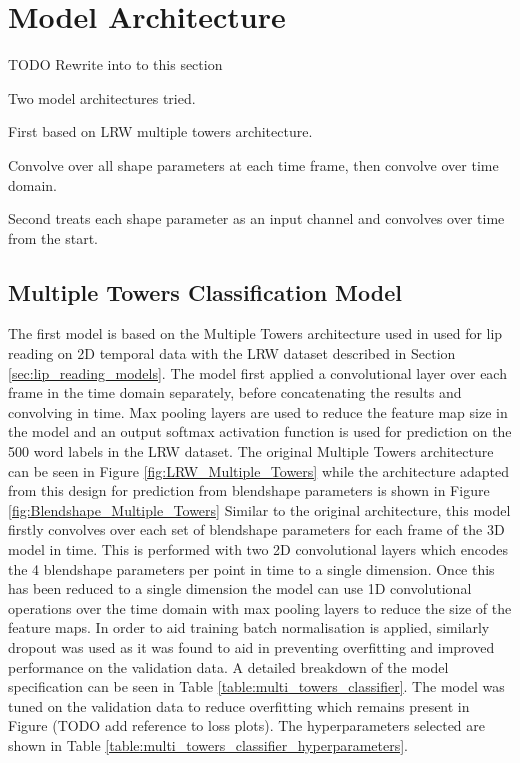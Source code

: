 \section{Model Architecture}

TODO Rewrite into to this section

Two model architectures tried.

First based on LRW multiple towers architecture.

Convolve over all shape parameters at each time frame, then convolve over time domain.

Second treats each shape parameter as an input channel and convolves over time from the start.

\subsection{Multiple Towers Classification Model}
The first model is based on the Multiple Towers architecture used in \cite{Cheng2016} used for lip reading on 2D temporal data with the LRW dataset described in Section \ref{sec:lip_reading_models}.
The model first applied a convolutional layer over each frame in the time domain separately, before concatenating the results and convolving in time.
Max pooling layers are used to reduce the feature map size in the model and an output softmax activation function is used for prediction on the 500 word labels in the LRW dataset.
The original Multiple Towers architecture can be seen in Figure \ref{fig:LRW_Multiple_Towers} while the architecture adapted from this design for prediction from blendshape parameters is shown in Figure \ref{fig:Blendshape_Multiple_Towers}
Similar to the original architecture, this model firstly convolves over each set of blendshape parameters for each frame of the 3D model in time.
This is performed with two 2D convolutional layers which encodes the 4 blendshape parameters per point in time to a single dimension.
Once this has been reduced to a single dimension the model can use 1D convolutional operations over the time domain with max pooling layers to reduce the size of the feature maps.
In order to aid training batch normalisation is applied, similarly dropout was used as it was found to aid in preventing overfitting and improved performance on the validation data.
A detailed breakdown of the model specification can be seen in Table \ref{table:multi_towers_classifier}.
The model was tuned on the validation data to reduce overfitting which remains present in Figure (TODO add reference to loss plots).
The hyperparameters selected are shown in Table \ref{table:multi_towers_classifier_hyperparameters}.

